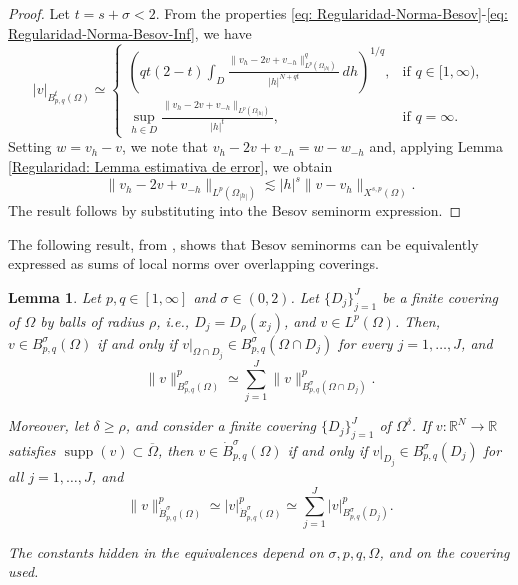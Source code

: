 \documentclass[]{amsart}
\newtheorem{Lemma}[theorem]{Lemma}
\theoremstyle{definition}
\theoremstyle{definition}
\theoremstyle{remark}
\numberwithin{equation}{section}
\begin{document}
	\begin{proof}
		Let \( t = s + \sigma < 2 \). From the properties \eqref{eq: Regularidad-Norma-Besov}-\eqref{eq: Regularidad-Norma-Besov-Inf}, we have
		\[
		|v|_{B_{p,q}^t(\Omega)} \simeq 
		\begin{cases}
			\left(q t(2 - t) \displaystyle \int_{D} \frac{\|v_h - 2v + v_{-h}\|_{L^p(\Omega_{|h|})}^q}{|h|^{N + q t}} \, dh\right)^{1/q}, & \text{if } q \in [1, \infty), \\[1em]
			\displaystyle \sup_{h \in D} \frac{\|v_h - 2v + v_{-h}\|_{L^p(\Omega_{|h|})}}{|h|^t}, & \text{if } q = \infty.
		\end{cases}
		\]
		Setting \( w = v_h - v \), we note that
        $v_h - 2v + v_{-h} = w - w_{-h}$ and,
		applying Lemma \ref{Regularidad: Lemma estimativa de error}, we obtain
		\[
		\|v_h - 2v + v_{-h}\|_{L^p(\Omega_{|h|})} \lesssim |h|^s \|v - v_h\|_{X^{s,p}(\Omega)}.
		\]
		The result follows by substituting into the Besov seminorm expression.
	\end{proof}
	
	The following result, from \cite[Lemma 2.6]{borthagaray2023besov}, shows that Besov seminorms can be equivalently expressed as sums of local norms over overlapping coverings.
	\begin{Lemma} \label{lemma:loc-Besov}
		Let \( p, q \in [1, \infty] \) and \( \sigma \in (0,2) \). Let \( \{ D_j \}_{j=1}^{J} \) be a finite covering of \( \Omega \) by balls of radius \( \rho \), i.e., \( D_j = D_\rho(x_j) \), and $v\in L^p(\Omega)$. Then, 
        \( v \in B^{\sigma}_{p,q}(\Omega) \) if and only if \( v|_{\Omega \cap D_j} \in B^{\sigma}_{p,q}(\Omega \cap D_j) \) for every \( j = 1, \ldots, J \), and
		\begin{equation}
			\|v\|^p_{B^{\sigma}_{p,q}(\Omega)} \simeq \sum_{j=1}^{J} \|v\|^p_{B^{\sigma}_{p,q}(\Omega \cap D_j)}.
		\end{equation}
		
		Moreover, let \( \delta \geq \rho \), and consider a finite covering \( \{ D_j \}_{j=1}^{J} \) of \( \Omega^\delta \). If \( v : \mathbb{R}^N \to \mathbb{R} \) satisfies \( \operatorname{supp}(v) \subset \overline{\Omega} \), then \( v \in \dot{B}^{\sigma}_{p,q}(\Omega) \) if and only if \( v|_{D_j} \in B^{\sigma}_{p,q}(D_j) \) for all \( j = 1, \ldots, J \), and
		\begin{equation}
			\|v\|^p_{\dot{B}^{\sigma}_{p,q}(\Omega)} \simeq |v|^p_{\dot{B}^{\sigma}_{p,q}(\Omega)} \simeq \sum_{j=1}^{J} |v|^p_{B^{\sigma}_{p,q}(D_j)}.
		\end{equation}
		
		The constants hidden in the equivalences depend on \( \sigma, p, q, \Omega \), and on the covering used.
	\end{Lemma}
	
\end{document}
